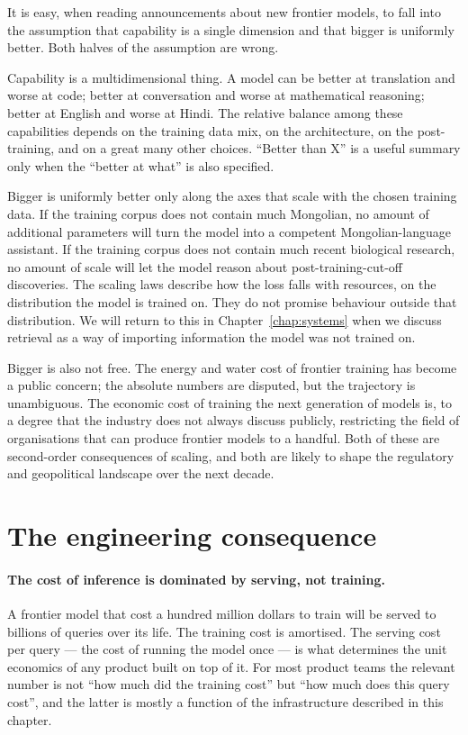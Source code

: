 It is easy, when reading announcements about new frontier
models, to fall into the assumption that capability is a single
dimension and that bigger is uniformly better. Both halves of
the assumption are wrong.

Capability is a multidimensional thing. A model can be better
at translation and worse at code; better at conversation and
worse at mathematical reasoning; better at English and worse
at Hindi. The relative balance among these capabilities depends
on the training data mix, on the architecture, on the post-
training, and on a great many other choices. ``Better than X''
is a useful summary only when the ``better at what'' is also
specified.

Bigger is uniformly better only along the axes that scale with
the chosen training data. If the training corpus does not
contain much Mongolian, no amount of additional parameters will
turn the model into a competent Mongolian-language assistant.
If the training corpus does not contain much recent biological
research, no amount of scale will let the model reason about
post-training-cut-off discoveries. The scaling laws describe
how the loss falls with resources, on the distribution the
model is trained on. They do not promise behaviour outside that
distribution. We will return to this in Chapter~\ref{chap:systems} when we
discuss retrieval as a way of importing information the model
was not trained on.

Bigger is also not free. The energy and water cost of frontier
training has become a public concern; the absolute numbers are
disputed, but the trajectory is unambiguous. The economic cost
of training the next generation of models is, to a degree that
the industry does not always discuss publicly, restricting the
field of organisations that can produce frontier models to a
handful. Both of these are second-order consequences of
scaling, and both are likely to shape the regulatory and
geopolitical landscape over the next decade.

\section{The engineering consequence}

\paragraph{The cost of inference is dominated by serving, not
training.} A frontier model that cost a hundred million
dollars to train will be served to billions of queries over
its life. The training cost is amortised. The serving cost
per query --- the cost of running the model once --- is what
determines the unit economics of any product built on top of
it. For most product teams the relevant number is not ``how
much did the training cost'' but ``how much does this query
cost'', and the latter is mostly a function of the
infrastructure described in this chapter.

